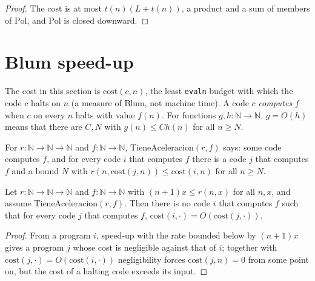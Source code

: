 \begin{proof}
  \leanok
  The cost is at most $t(n) (L + t(n))$, a product and a sum of members of $\mathrm{Pol}$, and
  $\mathrm{Pol}$ is closed downward.
\end{proof}

\section{Blum speed-up}
\label{sec:information-blum}

The cost in this section is $\mathrm{cost}(c, n)$, the least \texttt{evaln} budget with which the
code $c$ halts on $n$ (a measure of Blum, not machine time). A code $c$ \emph{computes} $f$ when
$c$ on every $n$ halts with value $f(n)$. For functions $g, h : \mathbb{N} \to \mathbb{N}$,
$g = O(h)$ means that there are $C, N$ with $g(n) \le C h(n)$ for all $n \ge N$.

\begin{definition}
  \label{def:information-speedup}
  \leanok
  For $r : \mathbb{N} \to \mathbb{N} \to \mathbb{N}$ and $f : \mathbb{N} \to \mathbb{N}$,
  $\mathrm{TieneAceleracion}(r, f)$ says: some code computes $f$, and for every code $i$ that
  computes $f$ there is a code $j$ that computes $f$ and a bound $N$ with
  $r(n, \mathrm{cost}(j, n)) \le \mathrm{cost}(i, n)$ for all $n \ge N$.
\end{definition}

\begin{theorem}
  \label{thm:information-blum-sin-optimo}
  \leanok
  Let $r : \mathbb{N} \to \mathbb{N} \to \mathbb{N}$ and $f : \mathbb{N} \to \mathbb{N}$ with
  $(n + 1) x \le r(n, x)$ for all $n, x$, and assume $\mathrm{TieneAceleracion}(r, f)$. Then there
  is no code $i$ that computes $f$ such that for every code $j$ that computes $f$,
  $\mathrm{cost}(i, \cdot) = O(\mathrm{cost}(j, \cdot))$.
\end{theorem}

\begin{proof}
  \leanok
  From a program $i$, speed-up with the rate bounded below by $(n+1)x$ gives a program $j$ whose
  cost is negligible against that of $i$; together with $\mathrm{cost}(j, \cdot) = O(\mathrm{cost}(i,
  \cdot))$ negligibility forces $\mathrm{cost}(j, n) = 0$ from some point on, but the cost of a
  halting code exceeds its input.
\end{proof}

